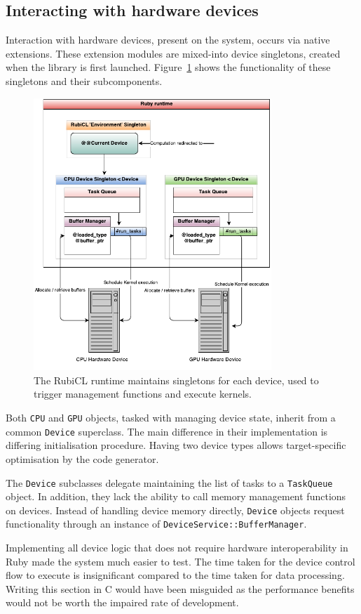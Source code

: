 \subsection{Interacting with hardware devices}
Interaction with hardware devices, present on the system, occurs via native extensions. These extension modules are mixed-into device singletons, created when the library is first launched. Figure~\ref{fig:rubicl_devices} shows the functionality of these singletons and their subcomponents.

\begin{figure}[h]
  \includegraphics[width=0.8\textwidth]{./figures/arch_diagram.pdf}
  \caption{The RubiCL runtime maintains singletons for each device, used to trigger management functions and execute kernels.}
  \label{fig:rubicl_devices}
\end{figure}

Both \verb|CPU| and \verb|GPU| objects, tasked with managing device state, inherit from a common \verb|Device| superclass. The main difference in their implementation is differing initialisation procedure. Having two device types allows target-specific optimisation by the code generator.

The \verb|Device| subclasses delegate maintaining the list of tasks to a \verb|TaskQueue| object. In addition, they lack the ability to call memory management functions on devices.
Instead of handling device memory directly, \verb|Device| objects request functionality through an instance of \verb|DeviceService::BufferManager|.

Implementing all device logic that does not require hardware interoperability in Ruby made the system much easier to test. The time taken for the device control flow to execute is insignificant compared to the time taken for data processing. Writing this section in C would have been misguided as the performance benefits would not be worth the impaired rate of development.


